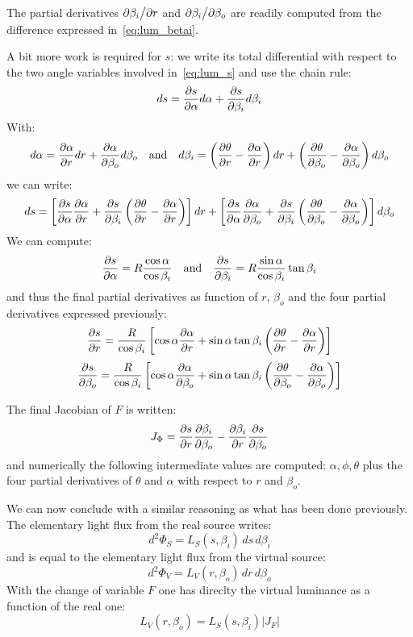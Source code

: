 The partial derivatives ${\partial{\beta_i}}\big/{\partial{r}}$ and ${\partial{\beta_i}}\big/{\partial{\beta_o}}$ are
readily computed from the difference expressed in~\eqref{eq:lum_betai}.

A bit more work is required for $s$: we write its total differential with respect to the 
two angle variables involved in~\eqref{eq:lum_s} and use the chain rule:
\[ ds = \frac{\partial{s}}{\partial{\alpha}}d\alpha + \frac{\partial{s}}{\partial{\beta_i}}d\beta_i \]
With:
\[
d\alpha = \frac{\partial{\alpha}}{\partial{r}}dr + \frac{\partial{\alpha}}{\partial{\beta_o}}d\beta_o
\quad\textrm{and}\quad
 d\beta_i = \left(\frac{\partial{\theta}}{\partial{r}} - \frac{\partial{\alpha}}{\partial{r}}\right) dr + 
        \left(\frac{\partial{\theta}}{\partial{\beta_o}} - \frac{\partial{\alpha}}{\partial{\beta_o}}\right) d\beta_o
 \]
we can write:
\[ds =  \left[ \frac{\partial{s}}{\partial{\alpha}}\frac{\partial{\alpha}}{\partial{r}} 
             + \frac{\partial{s}}{\partial{\beta_i}}\left( \frac{\partial{\theta}}{\partial{r}} - \frac{\partial{\alpha}}{\partial{r}} \right)
        \right] dr 
+       \left[ \frac{\partial{s}}{\partial{\alpha}}\frac{\partial{\alpha}}{\partial{\beta_o}} 
             + \frac{\partial{s}}{\partial{\beta_i}}\left( \frac{\partial{\theta}}{\partial{\beta_o}} - \frac{\partial{\alpha}}{\partial{\beta_o}} \right)
        \right] d\beta_o\]
We can compute:
\[ \frac{\partial{s}}{\partial{\alpha}} = R\frac{\cos\alpha}{\cos\beta_i} 
   \quad\textrm{and}\quad  
   \frac{\partial{s}}{\partial{\beta_i}} = R\frac{\sin\alpha}{\cos\beta_i}\tan\beta_i
   \] 
and thus the final partial derivatives as function of $r$, $\beta_o$ and the four
partial derivatives expressed previously:
\[\frac{\partial{s}}{\partial{r}}  = \frac{R}{\cos\beta_i}  \left[
      \cos\alpha\frac{\partial{\alpha}}{\partial{r}} + \sin\alpha\tan\beta_i
             \left( \frac{\partial{\theta}}{\partial{r}} - \frac{\partial{\alpha}}{\partial{r}} \right) 
    \right]
\]
\[
\frac{\partial{s}}{\partial{\beta_o}}  = \frac{R}{\cos\beta_i}  \left[
      \cos\alpha\frac{\partial{\alpha}}{\partial{\beta_o}} + \sin\alpha\tan\beta_i
            \left( \frac{\partial{\theta}}{\partial{\beta_o}} - \frac{\partial{\alpha}}{\partial{\beta_o}} \right)
     \right]
\]

The final Jacobian of $F$ is written:
\begin{equation}
J_\Phi = \frac{\partial{s}}{\partial{r}}\frac{\partial{\beta_i}}{\partial{\beta_o}} - \frac{\partial{\beta_i}}{\partial{r}}\frac{\partial{s}}{\partial{\beta_o}}
\end{equation}
and numerically the following intermediate values are computed: $\alpha, \phi, \theta $
 plus the four partial
derivatives of $\theta$ and $\alpha$ with respect to $r$ and $\beta_o$.

We can now conclude with a similar reasoning as what has been done previously. The 
elementary light flux from the real source writes:
\[d^2\Phi_S = L_S(s, \beta_i)\,ds\,d\beta_i\] 
and is equal to the elementary light flux from the virtual source:
\[ d^2\Phi_V = L_V(r, \beta_o)\,dr\,d\beta_o\]
With the change of variable $F$ one has direclty the virtual luminance as a function
of the real one:
\begin{equation}
L_V(r, \beta_o) = L_S(s, \beta_i) |J_F|
\end{equation}

